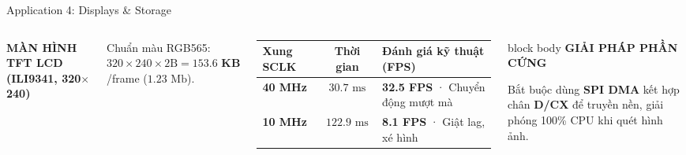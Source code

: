 \documentclass[10pt,aspectratio=169]{beamer}
\begin{document}
\begin{frame}[shrink=4]{Application 4: Displays \& Storage}
\transfade[duration=.35]
\vspace{-.2cm}
\begin{columns}[T,onlytextwidth]
{\color{cyan}\bfseries MÀN HÌNH TFT LCD (ILI9341, 320$\times$240)}\par\vspace{.08cm}
{\small Chuẩn màu RGB565: $320 \times 240 \times 2\text{B} = \mathbf{153.6\text{ KB}}$/frame ($1.23\text{ Mb}$).}\par\vspace{.1cm}
\setlength{\tabcolsep}{3pt}
\renewcommand{\arraystretch}{1.18}
\scriptsize
\begin{tabularx}{\linewidth}{>{\bfseries}l c X}
\toprule
Xung SCLK & Thời gian & Đánh giá kỹ thuật (FPS) \\
\midrule
40 MHz & $30.7\text{ ms}$ & \textbf{32.5 FPS} · Chuyển động mượt mà \\
10 MHz & $122.9\text{ ms}$ & \textbf{8.1 FPS} · Giật lag, xé hình \\
\bottomrule
\end{tabularx}
\vspace{.10cm}
\begin{beamercolorbox}[rounded=true,sep=5pt]{block body}
{\color{orange}\bfseries GIẢI PHÁP PHẦN CỨNG}\par\vspace{.06cm}
{\footnotesize Bắt buộc dùng \textbf{SPI DMA} kết hợp chân \textbf{D/CX} để truyền nền, giải phóng 100\% CPU khi quét hình ảnh.}
\end{beamercolorbox}


\end{columns}
\end{frame}
\end{document}

